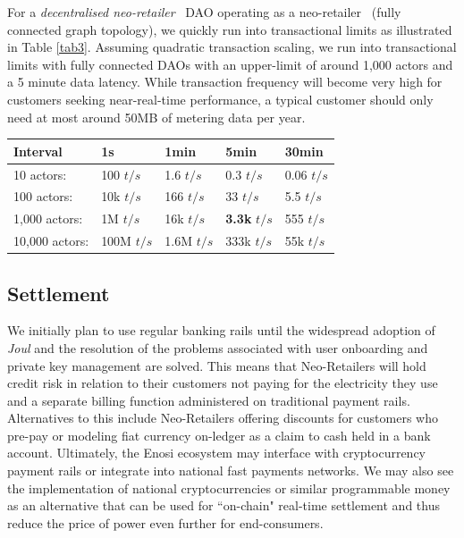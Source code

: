 \documentclass[a4paper,12pt,reqno]{amsart}
\theoremstyle{definition}
\begin{document}
For a \textit{decentralised neo-retailer} \textemdash \, DAO operating as a neo-retailer \textemdash \, (fully connected graph topology), we quickly run into transactional limits as illustrated in Table \ref{tab3}. Assuming quadratic transaction scaling, we run into transactional limits with fully connected DAOs with an upper-limit of around 1,000 actors and a 5 minute data latency. While transaction frequency will become very high for customers seeking near-real-time performance, a typical customer should only need at most around 50MB of metering data per year.

\vspace{+1em}

\begin{center}
\begin{tabular}{|l|l|l|l|l|}
\hline 	
 \textbf{Interval} 		& \textbf{1s} & \textbf{1min} & \textbf{5min} & \textbf{30min}\\
 \hline 
 \hline
 
 10 actors:		& 100 $t/s$	& 1.6 $t/s$	& 0.3 $t/s$	& 0.06 $t/s$ \\
 100 actors:	& 10k $t/s$	& 166 $t/s$	& 33 $t/s$	& 5.5 $t/s$ \\
 1,000 actors:	& 1M $t/s$	& 16k $t/s$	& \textbf{3.3k} $t/s$	& 555 $t/s$ \\
 10,000 actors:	& 100M $t/s$	& 1.6M $t/s$	& 333k $t/s$	& 55k $t/s$ \\
 \hline
 
\end{tabular}
\vspace{+1em}

\label{tab3}
\end{center}

\subsection*{Settlement}
We initially plan to use regular banking rails until the widespread adoption of \textit{Joul} and the resolution of the problems associated with user onboarding and private key management are solved. This means that Neo-Retailers will hold credit risk in relation to their customers not paying for the electricity they use and a separate billing function administered on traditional payment rails. Alternatives to this include Neo-Retailers offering discounts for customers who pre-pay or modeling fiat currency on-ledger as a claim to cash held in a bank account. Ultimately, the Enosi ecosystem may interface with cryptocurrency payment rails or integrate into national fast payments networks. We may also see the implementation of national cryptocurrencies or similar programmable money as an alternative that can be used for ``on-chain" real-time settlement and thus reduce the price of power even further for end-consumers.
\end{document}
